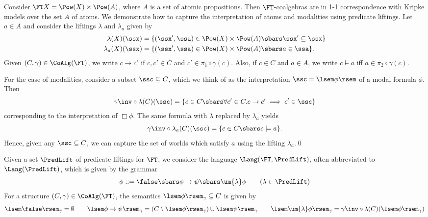 \documentclass{entcs}
\begin{document}
\begin{example} \label{example:kripke-liftings}
Consider $\FT X = \Pow(X) \times \Pow(A)$, where $A$ is a set of atomic
propositions. Then $\FT$-coalgebras are in 1-1 correspondence with Kripke models
over the set $A$ of atoms. We demonstrate how to capture the interpretation of
atoms and modalities using predicate liftings. Let $a \in A$ and consider the
liftings $\lambda$ and $\lambda_a$ given by
\begin{align*}
\lambda(X)(\ssx) & = \lbrace (\ssx', \ssa) \in \Pow(X) \times \Pow(A)
  \sbars \ssx' \subseteq \ssx \rbrace \\
\lambda_a(X)(\ssx) & = \lbrace (\ssx', \ssa) \in \Pow(X) \times \Pow(A)
  \sbars a \in \ssa \rbrace.
\end{align*}
%
Given $(C, \gamma) \in \CoAlg(\FT)$, we write $c \to c'$ if $c, c' \in C$ and
$c' \in \pi_1 \circ \gamma(c)$. Also, if $c \in C$ and $a \in A$, we write
$c \models a$ iff $a \in \pi_2 \circ \gamma(c)$. 

\sskip For the case of modalities, consider a subset $\ssc \subseteq C$, which
we think of as the interpretation $\ssc = \lsem \phi \rsem$ of a modal formula
$\phi$.  Then
\[
  \gamma\inv \circ \lambda(C)(\ssc)  = 
        \lbrace c \in C \sbars \forall c' \in C. c \to c' \implies c' \in \ssc \rbrace
\]
corresponding to the interpretation of $\Box \phi$. The same formula with
$\lambda$ replaced by $\lambda_a$ yields
\[
  \gamma\inv \circ \lambda_a(C)(\ssc) = 
        \lbrace c \in C \sbars c \models a \rbrace.
\]
Hence, given any $\ssc \subseteq C$, we can capture the set of worlds which
satisfy $a$ using the lifting $\lambda_a$.\qed
\end{example}

\begin{defn}
  Given a set $\PredLift$ of predicate liftings for $\FT$, we consider the
  language $\Lang(\FT,\PredLift)$, often abbreviated to $\Lang(\PredLift)$,
  which is given by the grammar
\[
  \phi ::= \false \sbars \phi \to \psi \sbars \um{\lambda} \phi 
        \qquad (\lambda \in \PredLift)
\]
For a structure $(C, \gamma) \in \CoAlg(\FT)$, the semantics $\lsem \phi
\rsem_{\gamma} \subseteq C$ is given by
\[
\lsem \false \rsem_{\gamma} = \emptyset %
\qquad \lsem \phi \to \psi \rsem_{\gamma} = (C \setminus \lsem \phi \rsem_{\gamma}) \cup \lsem \psi \rsem_{\gamma}%
\qquad \lsem \um{\lambda} \phi\rsem_{\gamma} = \gamma\inv \circ
\lambda(C)(\lsem \phi \rsem_{\gamma})
\]
\end{defn}
\end{document}
